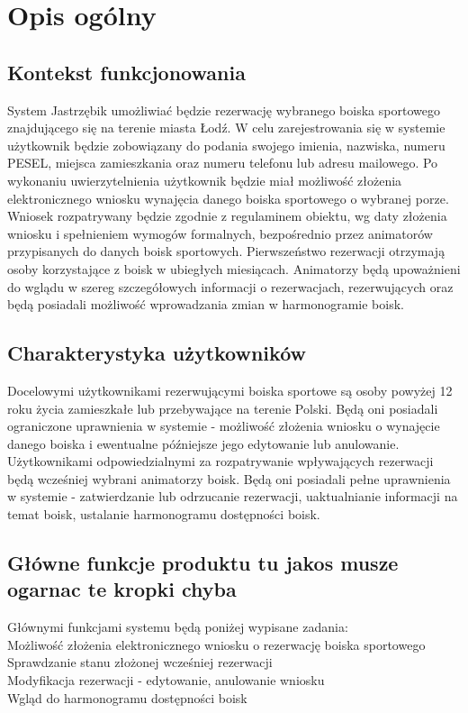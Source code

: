 \documentclass[a4paper, portrait,11pt]{article}
\begin{document}
\section {Opis ogólny}

\subsection {Kontekst funkcjonowania}
System Jastrzębik umożliwiać będzie rezerwację wybranego boiska sportowego znajdującego się na terenie miasta Łodź. W celu zarejestrowania się w systemie użytkownik będzie zobowiązany do podania swojego imienia, nazwiska, numeru PESEL, miejsca zamieszkania oraz numeru telefonu lub adresu mailowego. Po wykonaniu uwierzytelnienia użytkownik będzie miał możliwość złożenia elektronicznego wniosku wynajęcia danego boiska sportowego o wybranej porze. Wniosek rozpatrywany będzie zgodnie z regulaminem obiektu, wg daty złożenia wniosku i spełnieniem wymogów formalnych, bezpośrednio przez animatorów przypisanych do danych boisk sportowych. Pierwszeństwo rezerwacji otrzymają osoby korzystające z boisk w ubiegłych miesiącach. Animatorzy będą upoważnieni do wglądu w szereg szczegółowych informacji o rezerwacjach, rezerwujących oraz będą posiadali możliwość wprowadzania zmian w harmonogramie boisk. 

\subsection {Charakterystyka użytkowników}
Docelowymi użytkownikami rezerwującymi boiska sportowe są osoby powyżej 12 roku życia zamieszkałe lub przebywające na terenie Polski. Będą oni posiadali ograniczone uprawnienia w systemie - możliwość złożenia wniosku o wynajęcie danego boiska i ewentualne późniejsze jego edytowanie lub anulowanie.
\\\indent
Użytkownikami odpowiedzialnymi za rozpatrywanie wpływających rezerwacji będą wcześniej wybrani animatorzy boisk. Będą oni posiadali pełne uprawnienia w systemie - zatwierdzanie lub odrzucanie rezerwacji, uaktualnianie informacji na temat boisk, ustalanie harmonogramu dostępności boisk.

\subsection {Główne funkcje produktu tu jakos musze ogarnac te kropki chyba}
Głównymi funkcjami systemu będą poniżej wypisane zadania: 
\\ Możliwość złożenia elektronicznego wniosku o rezerwację boiska sportowego
\\ Sprawdzanie stanu złożonej wcześniej rezerwacji
\\ Modyfikacja rezerwacji - edytowanie, anulowanie wniosku
\\ Wgląd do harmonogramu dostępności boisk
 
\end{document}
